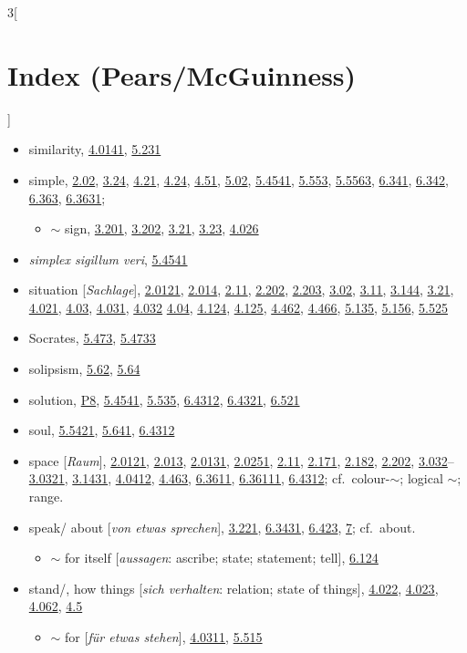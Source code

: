 \documentclass[oneside,openany,12pt]{book}
\newcommand{\indexentry}[1]{\item #1}
\newcommand{\indexsubentry}[1]{\begin{itemize} \item #1 \end{itemize}}
\newcommand{\indexref}[1]{\hyperlink{prop#1}{#1}}
\begin{document}
\begin{multicols}{3}[\section*{Index (Pears/McGuinness)}]
\begin{itemize}
\indexentry{similarity, \indexref{4.0141}, \indexref{5.231}}

\indexentry{simple, \indexref{2.02}, \indexref{3.24}, \indexref{4.21}, \indexref{4.24}, \indexref{4.51}, \indexref{5.02}, \indexref{5.4541}, \indexref{5.553}, \indexref{5.5563}, \indexref{6.341}, \indexref{6.342}, \indexref{6.363}, \indexref{6.3631};}

   \indexsubentry{$\sim$ sign, \indexref{3.201}, \indexref{3.202}, \indexref{3.21}, \indexref{3.23}, \indexref{4.026}}

\indexentry{\textit{simplex sigillum veri}, \indexref{5.4541}}

\indexentry{situation [\textit{Sachlage}], \indexref{2.0121}, \indexref{2.014}, \indexref{2.11}, \indexref{2.202}, \indexref{2.203}, \indexref{3.02}, \indexref{3.11}, \indexref{3.144}, \indexref{3.21}, \indexref{4.021}, \indexref{4.03}, \indexref{4.031}, \indexref{4.032} \indexref{4.04}, \indexref{4.124}, \indexref{4.125}, \indexref{4.462}, \indexref{4.466}, \indexref{5.135}, \indexref{5.156}, \indexref{5.525}}

\indexentry{Socrates, \indexref{5.473}, \indexref{5.4733}}

\indexentry{solipsism, \indexref{5.62}, \indexref{5.64}}

\indexentry{solution, \hyperlink{pref8}{P8}, \indexref{5.4541}, \indexref{5.535}, \indexref{6.4312}, \indexref{6.4321}, \indexref{6.521}}

\indexentry{soul, \indexref{5.5421}, \indexref{5.641}, \indexref{6.4312}}

\indexentry{space [\textit{Raum}], \indexref{2.0121}, \indexref{2.013}, \indexref{2.0131}, \indexref{2.0251}, \indexref{2.11}, \indexref{2.171}, \indexref{2.182}, \indexref{2.202}, \indexref{3.032}--\indexref{3.0321}, \indexref{3.1431}, \indexref{4.0412}, \indexref{4.463}, \indexref{6.3611}, \indexref{6.36111}, \indexref{6.4312}; cf.\ colour-$\sim$; logical $\sim$; range.}

\indexentry{speak/ about [\textit{von etwas sprechen}], \indexref{3.221}, \indexref{6.3431}, \indexref{6.423}, \indexref{7}; cf.\ about.}

   \indexsubentry{$\sim$ for itself [\textit{aussagen}: ascribe; state; statement; tell], \indexref{6.124}}

\indexentry{stand/, how things [\textit{sich verhalten}: relation; state of things], \indexref{4.022}, \indexref{4.023}, \indexref{4.062}, \indexref{4.5}}

   \indexsubentry{$\sim$ for [\textit{f{\"u}r etwas stehen}], \indexref{4.0311}, \indexref{5.515}}


\end{itemize}
\end{multicols}
\end{document}
